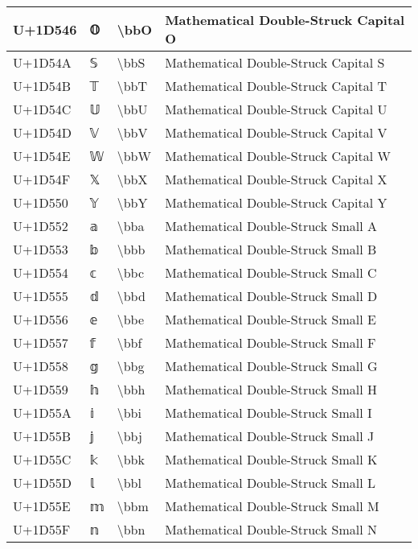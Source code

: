 \begin{table}[h]
\begin{tabulary}{\linewidth}{|L|L|L|L|}
\hline
U+1D546 & 𝕆 & {\textbackslash}bbO & Mathematical Double-Struck Capital O \\
\hline
U+1D54A & 𝕊 & {\textbackslash}bbS & Mathematical Double-Struck Capital S \\
\hline
U+1D54B & 𝕋 & {\textbackslash}bbT & Mathematical Double-Struck Capital T \\
\hline
U+1D54C & 𝕌 & {\textbackslash}bbU & Mathematical Double-Struck Capital U \\
\hline
U+1D54D & 𝕍 & {\textbackslash}bbV & Mathematical Double-Struck Capital V \\
\hline
U+1D54E & 𝕎 & {\textbackslash}bbW & Mathematical Double-Struck Capital W \\
\hline
U+1D54F & 𝕏 & {\textbackslash}bbX & Mathematical Double-Struck Capital X \\
\hline
U+1D550 & 𝕐 & {\textbackslash}bbY & Mathematical Double-Struck Capital Y \\
\hline
U+1D552 & 𝕒 & {\textbackslash}bba & Mathematical Double-Struck Small A \\
\hline
U+1D553 & 𝕓 & {\textbackslash}bbb & Mathematical Double-Struck Small B \\
\hline
U+1D554 & 𝕔 & {\textbackslash}bbc & Mathematical Double-Struck Small C \\
\hline
U+1D555 & 𝕕 & {\textbackslash}bbd & Mathematical Double-Struck Small D \\
\hline
U+1D556 & 𝕖 & {\textbackslash}bbe & Mathematical Double-Struck Small E \\
\hline
U+1D557 & 𝕗 & {\textbackslash}bbf & Mathematical Double-Struck Small F \\
\hline
U+1D558 & 𝕘 & {\textbackslash}bbg & Mathematical Double-Struck Small G \\
\hline
U+1D559 & 𝕙 & {\textbackslash}bbh & Mathematical Double-Struck Small H \\
\hline
U+1D55A & 𝕚 & {\textbackslash}bbi & Mathematical Double-Struck Small I \\
\hline
U+1D55B & 𝕛 & {\textbackslash}bbj & Mathematical Double-Struck Small J \\
\hline
U+1D55C & 𝕜 & {\textbackslash}bbk & Mathematical Double-Struck Small K \\
\hline
U+1D55D & 𝕝 & {\textbackslash}bbl & Mathematical Double-Struck Small L \\
\hline
U+1D55E & 𝕞 & {\textbackslash}bbm & Mathematical Double-Struck Small M \\
\hline
U+1D55F & 𝕟 & {\textbackslash}bbn & Mathematical Double-Struck Small N \\

\end{tabulary}
\end{table}
